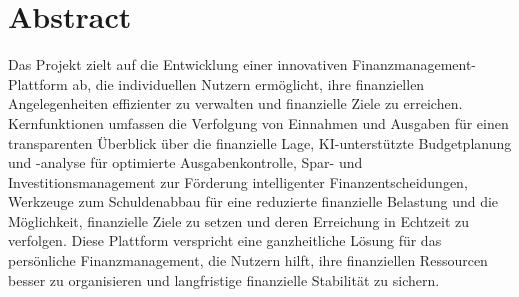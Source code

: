 \chapter{Abstract}

Das Projekt zielt auf die Entwicklung einer innovativen Finanzmanagement-Plattform ab, 
die individuellen Nutzern ermöglicht, ihre finanziellen Angelegenheiten effizienter zu 
verwalten und finanzielle Ziele zu erreichen. Kernfunktionen umfassen die Verfolgung von 
Einnahmen und Ausgaben für einen transparenten Überblick über die finanzielle Lage, KI-unterstützte 
Budgetplanung und -analyse für optimierte Ausgabenkontrolle, Spar- und Investitionsmanagement zur
Förderung intelligenter Finanzentscheidungen, Werkzeuge zum Schuldenabbau für eine reduzierte finanzielle
Belastung und die Möglichkeit, finanzielle Ziele zu setzen und deren Erreichung in Echtzeit zu verfolgen. 
Diese Plattform verspricht eine ganzheitliche Lösung für das persönliche Finanzmanagement, die Nutzern hilft, 
ihre finanziellen Ressourcen besser zu organisieren und langfristige finanzielle Stabilität zu sichern.

